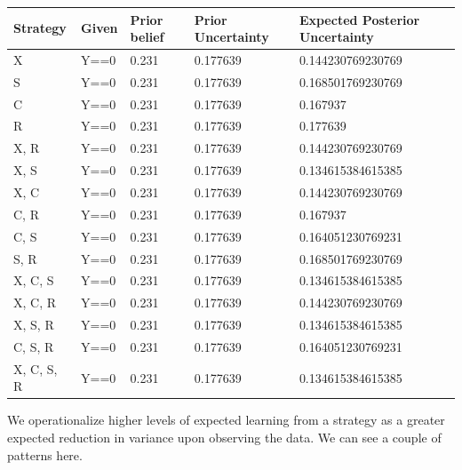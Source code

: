 \documentclass[
  12pt,
]{book}
\begin{document}
\begin{tabular}{l|l|l|l|l}
\hline
Strategy & Given & Prior belief & Prior Uncertainty & Expected Posterior Uncertainty\\
\hline
X & Y==0 & 0.231 & 0.177639 & 0.144230769230769\\
\hline
S & Y==0 & 0.231 & 0.177639 & 0.168501769230769\\
\hline
C & Y==0 & 0.231 & 0.177639 & 0.167937\\
\hline
R & Y==0 & 0.231 & 0.177639 & 0.177639\\
\hline
X, R & Y==0 & 0.231 & 0.177639 & 0.144230769230769\\
\hline
X, S & Y==0 & 0.231 & 0.177639 & 0.134615384615385\\
\hline
X, C & Y==0 & 0.231 & 0.177639 & 0.144230769230769\\
\hline
C, R & Y==0 & 0.231 & 0.177639 & 0.167937\\
\hline
C, S & Y==0 & 0.231 & 0.177639 & 0.164051230769231\\
\hline
S, R & Y==0 & 0.231 & 0.177639 & 0.168501769230769\\
\hline
X, C, S & Y==0 & 0.231 & 0.177639 & 0.134615384615385\\
\hline
X, C, R & Y==0 & 0.231 & 0.177639 & 0.144230769230769\\
\hline
X, S, R & Y==0 & 0.231 & 0.177639 & 0.134615384615385\\
\hline
C, S, R & Y==0 & 0.231 & 0.177639 & 0.164051230769231\\
\hline
X, C, S, R & Y==0 & 0.231 & 0.177639 & 0.134615384615385\\
\hline
\end{tabular}

We operationalize higher levels of expected learning from a strategy as a greater expected reduction in variance upon observing the data. We can see a couple of patterns here.
\end{document}

